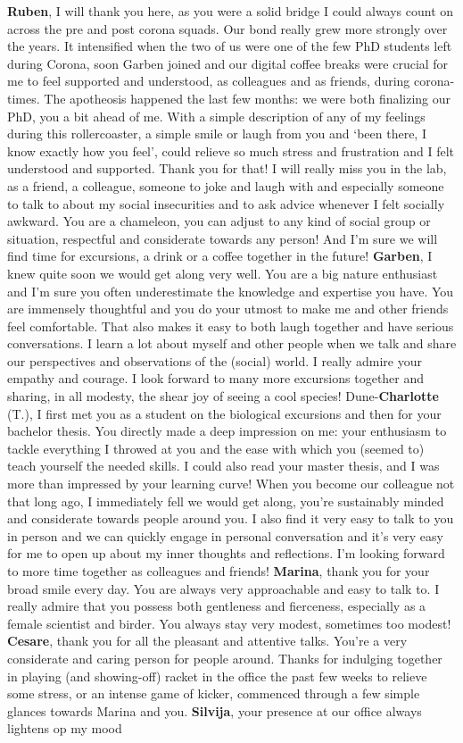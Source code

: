 \documentclass[10pt, twoside]{book} %
\begin{document}
\begin{small}
\textbf{Ruben}, I will thank you here, as you were a solid bridge I could always count on across the pre and post corona squads. Our bond really grew more strongly over the years. It intensified when the two of us were one of the few PhD students left during Corona, soon Garben joined and our digital coffee breaks were crucial for me to feel supported and understood, as colleagues and as friends, during corona-times. The apotheosis happened the last few months: we were both finalizing our PhD, you a bit ahead of me. With a simple description of any of my feelings during this rollercoaster, a simple smile or laugh from you and `been there, I know exactly how you feel', could relieve so much stress and frustration and I felt understood and supported. Thank you for that! I will really miss you in the lab, as a friend, a colleague, someone to joke and laugh with and especially someone to talk to about my social insecurities and to ask advice whenever I felt socially awkward. You are a chameleon, you can adjust to any kind of social group or situation, respectful and considerate towards any person! And I'm sure we will find time for excursions, a drink or a coffee together in the future! \textbf{Garben}, I knew quite soon we would get along very well. You are a big nature enthusiast and I'm sure you often underestimate the knowledge and expertise you have. You are immensely thoughtful and you do your utmost to make me and other friends feel comfortable. That also makes it easy to both laugh together and have serious conversations. I learn a lot about myself and other people when we talk and share our perspectives and observations of the (social) world. I really admire your empathy and courage. I look forward to many more excursions together and sharing, in all modesty, the shear joy of seeing a cool species! Dune-\textbf{Charlotte} (T.), I first met you as a student on the biological excursions and then for your bachelor thesis. You directly made a deep impression on me: your enthusiasm to tackle everything I throwed at you and the ease with which you (seemed to) teach yourself the needed skills. I could also read your master thesis, and I was more than impressed by your learning curve! When you become our colleague not that long ago, I immediately fell we would get along, you're sustainably minded and considerate towards people around you. I also find it very easy to talk to you in person and we can quickly engage in personal conversation and it's very easy for me to open up about my inner thoughts and reflections. I'm looking forward to more time together as colleagues and friends! \textbf{Marina}, thank you for your broad smile every day. You are always very approachable and easy to talk to. I really admire that you possess both gentleness and fierceness, especially as a female scientist and birder. You always stay very modest, sometimes too modest! \textbf{Cesare}, thank you for all the pleasant and attentive talks. You're a very considerate and caring person for people around. Thanks for indulging together in playing (and showing-off) racket in the office the past few weeks to relieve some stress, or an intense game of kicker, commenced through a few simple glances towards Marina and you. \textbf{Silvija}, your presence at our office always lightens op my mood 
\end{small}
\end{document}
